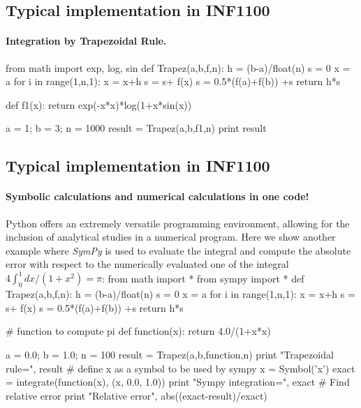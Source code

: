 \documentclass[%
twoside,                 %
final,                   %
10pt]{article}
\begin{document}
\subsection{Typical implementation in INF1100}

\paragraph{Integration by Trapezoidal Rule.}

\bpycod
from math import exp, log, sin
def Trapez(a,b,f,n):
   h = (b-a)/float(n)
   s = 0
   x = a
   for i in range(1,n,1):
       x = x+h
       s = s+ f(x)
   s = 0.5*(f(a)+f(b)) +s
   return h*s

def f1(x):
    return exp(-x*x)*log(1+x*sin(x))

a = 1;  b = 3; n = 1000
result = Trapez(a,b,f1,n)
print result
\epycod




\subsection{Typical implementation in INF1100}

\paragraph{Symbolic calculations and numerical calculations in one code!}
Python offers an  extremely versatile programming  environment, allowing for the inclusion of analytical studies in a numerical program. Here we show another example
where \emph{SymPy} is used to evaluate the integral and compute the absolute error 
with respect to the numerically evaluated one of the integral
$4\int_0^1 dx/(1+x^2) = \pi$: 
\bpycod
from math import *
from sympy import *
def Trapez(a,b,f,n):
   h = (b-a)/float(n)
   s = 0
   x = a
   for i in range(1,n,1):
       x = x+h
       s = s+ f(x)
   s = 0.5*(f(a)+f(b)) +s
   return h*s

#  function to compute pi
def function(x):
    return 4.0/(1+x*x)

a = 0.0;  b = 1.0; n = 100
result = Trapez(a,b,function,n)
print "Trapezoidal rule=", result
# define x as a symbol to be used by sympy
x = Symbol('x')
exact = integrate(function(x), (x, 0.0, 1.0))
print "Sympy integration=", exact
# Find relative error
print "Relative error", abs((exact-result)/exact)
\epycod
\end{document}
